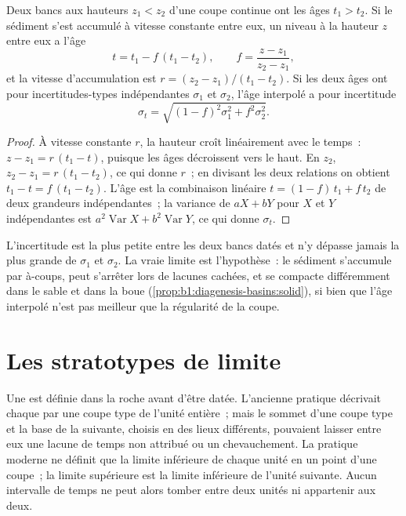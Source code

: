 \begin{proposition}\label{prop:b1:stratigraphic-scale:interpolation}
Deux bancs aux hauteurs $z_1 < z_2$ d'une coupe continue ont les âges
$t_1 > t_2$. Si le sédiment s'est accumulé à vitesse constante entre eux, un
niveau à la hauteur $z$ entre eux a l'âge
\[
  t = t_1 - f\,(t_1 - t_2), \qquad f = \frac{z - z_1}{z_2 - z_1},
\]
et la vitesse d'accumulation est $r = (z_2 - z_1)/(t_1 - t_2)$. Si les deux âges
ont pour incertitudes-types indépendantes $\sigma_1$ et $\sigma_2$, l'âge
interpolé a pour incertitude
\[
  \sigma_t = \sqrt{(1 - f)^2 \sigma_1^2 + f^2 \sigma_2^2}.
\]
\end{proposition}

\begin{proof}
À vitesse constante $r$, la hauteur croît linéairement avec le temps~: $z - z_1 = r\,(t_1
- t)$, puisque les âges décroissent vers le haut. En $z_2$, $z_2 - z_1 = r\,(t_1 - t_2)$, ce qui
donne $r$~; en divisant les deux relations on obtient $t_1 - t = f\,(t_1 - t_2)$. L'âge
est la combinaison linéaire $t = (1 - f)\,t_1 + f\,t_2$ de deux grandeurs
indépendantes~; la variance de $a X + b Y$ pour $X$ et $Y$ indépendantes est $a^2
\operatorname{Var} X + b^2 \operatorname{Var} Y$, ce qui donne $\sigma_t$.
\end{proof}

L'incertitude est la plus petite entre les deux bancs datés et n'y dépasse jamais
la plus grande de $\sigma_1$ et $\sigma_2$. La vraie limite est l'hypothèse~:
le sédiment s'accumule par à-coups, peut s'arrêter lors de lacunes cachées, et se compacte
différemment dans le sable et dans la boue (\cref{prop:b1:diagenesis-basins:solid}), si bien que
l'âge interpolé n'est pas meilleur que la régularité de la coupe.

\section{Les stratotypes de limite}\label{sec:b1:stratigraphic-scale:gssp}

Une  est définie dans la roche avant d'être datée. L'ancienne
pratique décrivait chaque  par une coupe type de l'unité entière~; mais le sommet
d'une coupe type et la base de la suivante, choisis en des lieux différents, pouvaient
laisser entre eux une lacune de temps non attribué ou un chevauchement. La pratique moderne
ne définit que la limite inférieure de chaque unité en un point d'une coupe~; la
limite supérieure est la limite inférieure de l'unité suivante. Aucun intervalle de temps ne peut
alors tomber entre deux unités ni appartenir aux deux.

